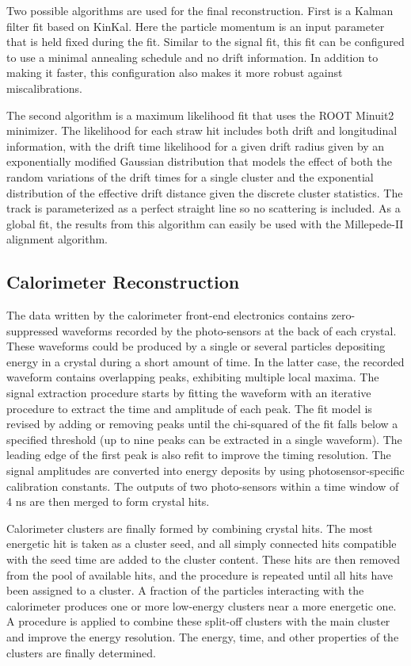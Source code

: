 Two possible algorithms are used for the final reconstruction. First is a Kalman filter fit based on KinKal. Here the particle momentum is an input parameter that is held fixed during the fit. Similar to the signal fit, this fit can be configured to use a minimal annealing schedule and no drift information. In addition to making it faster, this configuration also makes it more robust against miscalibrations.

The second algorithm is a maximum likelihood fit that uses the ROOT Minuit2 minimizer. The likelihood for each straw hit includes both drift and longitudinal information, with the drift time likelihood for a given drift radius given by an exponentially modified Gaussian distribution that models the effect of both the random variations of the drift times for a single cluster and the exponential distribution of the effective drift distance given the discrete cluster statistics. The track is parameterized as a perfect straight line so no scattering is included. As a global fit, the results from this algorithm can easily be used with the Millepede-II alignment algorithm. 

\subsection{Calorimeter Reconstruction}

The data written by the calorimeter front-end electronics contains zero-suppressed waveforms recorded by the photo-sensors at the back of each crystal. These waveforms could be produced by a single or several particles depositing energy in a crystal during a short amount of time. In the latter case, the recorded waveform contains overlapping peaks, exhibiting multiple local maxima. The signal extraction procedure starts by fitting the waveform with an iterative procedure to extract the time and amplitude of each peak. The fit model is revised by adding or removing peaks until the chi-squared of the fit falls below a specified threshold (up to nine peaks can be extracted in a single waveform). The leading edge of the first peak is also refit to improve the timing resolution. The signal amplitudes are converted into energy deposits by using photosensor-specific calibration constants. The outputs of two photo-sensors within a time window of 4 ns are then merged to form crystal hits. 

Calorimeter clusters are finally formed by combining crystal hits. The most energetic hit is taken as a cluster seed, and all simply connected hits compatible with the seed time are added to the cluster content. These hits are then removed from the pool of available hits, and the procedure is repeated until all hits have been assigned to a cluster. A fraction of the particles interacting with the calorimeter produces one or more low-energy clusters near a more energetic one. A procedure is applied to combine these split-off clusters with the main cluster and improve the energy resolution. The energy, time, and other properties of the clusters are finally determined.

